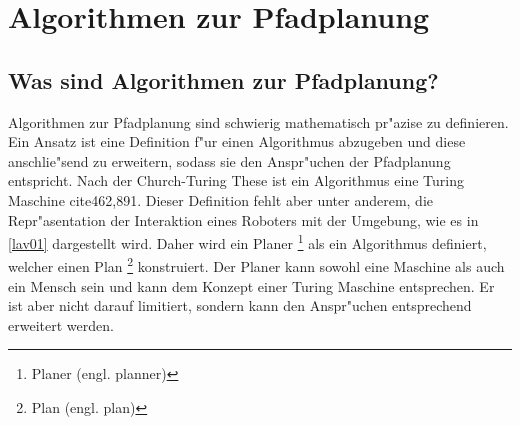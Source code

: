 \chapter{Algorithmen zur Pfadplanung}
\section{Was sind Algorithmen zur Pfadplanung?}

Algorithmen zur Pfadplanung sind schwierig mathematisch pr"azise zu definieren. Ein Ansatz ist eine Definition f"ur einen Algorithmus abzugeben und diese anschlie"send zu erweitern, sodass sie den Anspr"uchen der Pfadplanung entspricht. Nach der Church-Turing These ist ein Algorithmus eine Turing Maschine cite{462,891}. Dieser Definition fehlt aber unter anderem, die Repr"asentation der Interaktion eines Roboters mit der Umgebung, wie es in \ref{lav01} dargestellt wird. Daher wird ein Planer \footnote{Planer (engl. planner)} als ein Algorithmus definiert, welcher einen Plan \footnote{Plan (engl. plan)} konstruiert. Der Planer kann sowohl eine Maschine als auch ein Mensch sein und kann dem Konzept einer Turing Maschine entsprechen. Er ist aber nicht darauf limitiert, sondern kann den Anspr"uchen entsprechend erweitert werden.\cite[~S. 19ff]{Lav06} 

